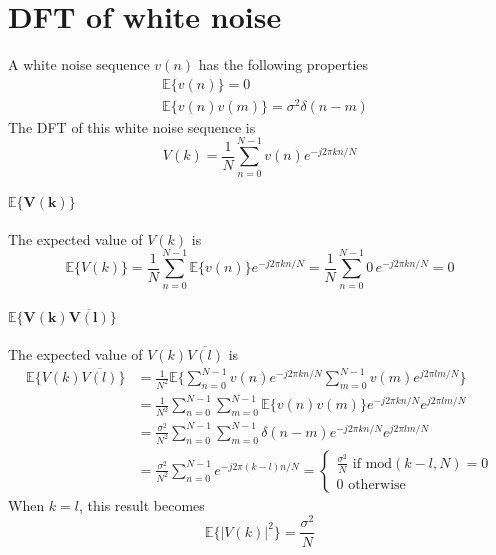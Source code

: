 \newpage
\section{DFT of white noise}
\label{appendix:white_noise}

A white noise sequence $v(n)$ has the following properties
\begin{align*}
    &\mathbb{E}\{v(n)\} = 0\\
    &\mathbb{E}\{v(n)v(m)\} = \sigma^2 \delta(n-m)
\end{align*}
The DFT of this white noise sequence is
\begin{equation*}
    V(k) = \frac{1}{N}\sum_{n=0}^{N-1} v(n) e^{-j 2\pi k n/N}
\end{equation*}

\paragraph{$\boldsymbol{\mathbb{E}\{V(k)\}}$} 
The expected value of $V(k)$ is
\begin{equation*}
    \mathbb{E}\{V(k)\} = \frac{1}{N}\sum_{n=0}^{N-1} \mathbb{E}\{v(n)\} e^{-j 2\pi k n/N} = \frac{1}{N}\sum_{n=0}^{N-1} 0 \, e^{-j 2\pi k n/N} = 0
\end{equation*}

\paragraph{$\boldsymbol{\mathbb{E}\{V(k)\overline{V(l)}\}}$}
The expected value of $V(k)\overline{V(l)}$ is
\begin{align*}
    \mathbb{E}\{V(k)\overline{V(l)}\} &= \frac{1}{N^2}\mathbb{E}\{\sum_{n=0}^{N-1} v(n) e^{-j 2\pi k n/N} \sum_{m=0}^{N-1} v(m) e^{j 2\pi l m/N}\}\\
    &= \frac{1}{N^2}\sum_{n=0}^{N-1}\sum_{m=0}^{N-1} \mathbb{E}\{v(n)v(m)\}  e^{-j 2\pi k n/N} e^{j 2\pi l m/N}\\
    &=\frac{\sigma^2}{N^2}\sum_{n=0}^{N-1}\sum_{m=0}^{N-1}\delta(n-m)  e^{-j 2\pi k n/N} e^{j 2\pi l m/N}\\
    &=\frac{\sigma^2}{N^2}\sum_{n=0}^{N-1}e^{-j 2\pi (k-l) n/N} =
    \begin{cases} 
        \frac{\sigma^2}{N} \text{ if } \text{mod}(k-l,N) = 0\\
        0 \text{ otherwise}
    \end{cases}
\end{align*}
When $k = l$, this result becomes
\begin{equation*}
    \mathbb{E}\{|V(k)|^2\} = \frac{\sigma^2}{N}
\end{equation*}

